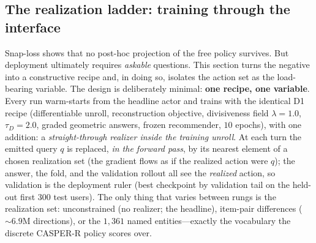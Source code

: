 \documentclass[11pt]{article}
\begin{document}
\subsection{The realization ladder: training through the interface}\label{sec:ladder}
Snap-loss shows that no post-hoc projection of the free policy survives. But deployment ultimately requires
\emph{askable} questions. This section turns the negative into a constructive recipe and, in doing so, isolates the
action set as the load-bearing variable. The design is deliberately minimal: \textbf{one recipe, one variable}. Every
run warm-starts from the headline actor and trains with the identical D1 recipe (differentiable unroll, reconstruction
objective, divisiveness field $\lambda{=}1.0$, $\tau_D{=}2.0$, graded geometric answers, frozen recommender,
$10$ epochs), with one addition: a \emph{straight-through realizer inside the training unroll}. At each turn the
emitted query $q$ is replaced, \emph{in the forward pass}, by its nearest element of a chosen realization set (the
gradient flows as if the realized action were $q$); the answer, the fold, and the validation rollout all see the
\emph{realized} action, so validation is the deployment ruler (best checkpoint by validation tail on the held-out
first $300$ test users). The only thing that varies between rungs is the realization set: unconstrained (no realizer;
the headline), item-pair differences (${\sim}6.9$M directions), or the $1{,}361$ named entities---exactly the
vocabulary the discrete CASPER-R policy scores over.
\end{document}
